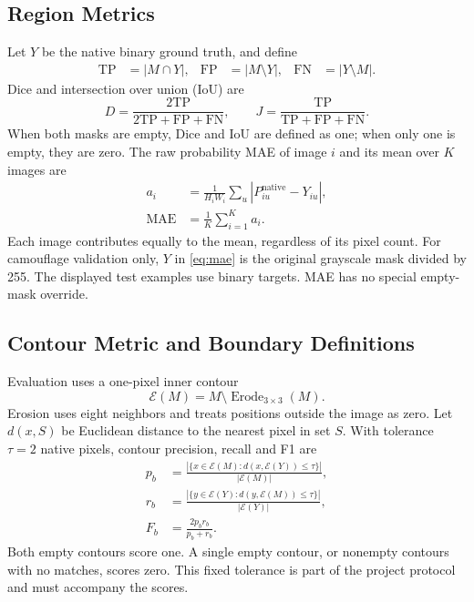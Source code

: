 \documentclass[conference,letterpaper]{IEEEtran}
\begin{document}
\subsection{Region Metrics}
Let $Y$ be the native binary ground truth, and define
\begin{equation}
\begin{aligned}
 \mathrm{TP}&=|M\cap Y|,&
 \mathrm{FP}&=|M\setminus Y|,&
 \mathrm{FN}&=|Y\setminus M|.
\end{aligned}
\label{eq:counts}
\end{equation}
Dice and intersection over union (IoU) are
\begin{equation}
 D=\frac{2\mathrm{TP}}{2\mathrm{TP}+\mathrm{FP}+\mathrm{FN}},
 \qquad
 J=\frac{\mathrm{TP}}{\mathrm{TP}+\mathrm{FP}+\mathrm{FN}}.
 \label{eq:overlap}
\end{equation}
When both masks are empty, Dice and IoU are defined as one; when only one is empty, they are zero. The raw probability MAE of image $i$ and its mean over $K$ images are
\begin{equation}
\begin{aligned}
 a_i&=\frac1{H_iW_i}\sum_u|P^{\mathrm{native}}_{iu}-Y_{iu}|,\\
 \operatorname{MAE}&=\frac1K\sum_{i=1}^{K} a_i.
\end{aligned}
\label{eq:mae}
\end{equation}
Each image contributes equally to the mean, regardless of its pixel count. For camouflage validation only, $Y$ in \eqref{eq:mae} is the original grayscale mask divided by 255. The displayed test examples use binary targets. MAE has no special empty-mask override.

\subsection{Contour Metric and Boundary Definitions}
Evaluation uses a one-pixel inner contour
\begin{equation}
 \mathcal E(M)=M\setminus
 \operatorname{Erode}_{3\times3}(M).
 \label{eq:contour}
\end{equation}
Erosion uses eight neighbors and treats positions outside the image as zero. Let $d(x,S)$ be Euclidean distance to the nearest pixel in set $S$. With tolerance $\tau=2$ native pixels, contour precision, recall and F1 are
\begin{equation}
\begin{aligned}
 p_b&=\frac{|\{x\in\mathcal E(M):d(x,\mathcal E(Y))\leq\tau\}|}
 {|\mathcal E(M)|},\\
 r_b&=\frac{|\{y\in\mathcal E(Y):d(y,\mathcal E(M))\leq\tau\}|}
 {|\mathcal E(Y)|},\\
 F_b&=\frac{2p_br_b}{p_b+r_b}.
\end{aligned}
\label{eq:bf1}
\end{equation}
Both empty contours score one. A single empty contour, or nonempty contours with no matches, scores zero. This fixed tolerance is part of the project protocol and must accompany the scores.
\end{document}
